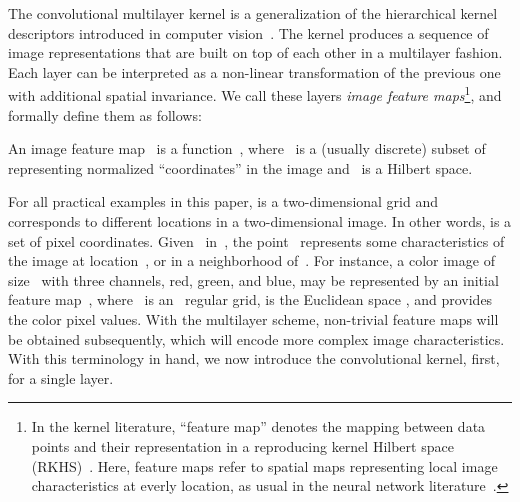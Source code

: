 The convolutional multilayer kernel is a generalization of the hierarchical kernel
descriptors introduced in computer vision~\cite{bo2011,bo2010}. The kernel produces a
sequence of image representations that are built on top of each other in a
multilayer fashion. Each layer can be interpreted as a non-linear
transformation of the previous one with additional spatial invariance. We call these
layers \emph{image feature maps}\footnote{In the kernel literature, ``feature map'' denotes the mapping between data points and their representation in a reproducing kernel Hilbert space (RKHS)~\cite{shawe2004}. Here, feature maps refer to spatial maps representing local image characteristics at everly location, as usual in the neural network literature~\cite{lecun1998}.}, and formally define them as follows:
\begin{definition}
   An image feature map~ is a function~, where~ is a (usually discrete) subset of~
   representing normalized ``coordinates'' in the image and~ is a Hilbert space.
\end{definition}
For all practical examples in this paper,  is a two-dimensional grid
and corresponds to different locations in a two-dimensional image. In other
words,  is a set of pixel coordinates. Given~ in~, the
point~ represents some characteristics of the image at
location~, or in a neighborhood of~.
For instance, a color image of size~ with three
channels, red, green, and blue, may be represented by an initial feature
map~, where~ is an~ regular grid,  is the Euclidean space , and 
provides the color pixel values. With the multilayer scheme, non-trivial feature maps will be
obtained subsequently, which will encode more complex image characteristics.
With this terminology in hand, we now introduce the convolutional kernel, first, for a single layer.

